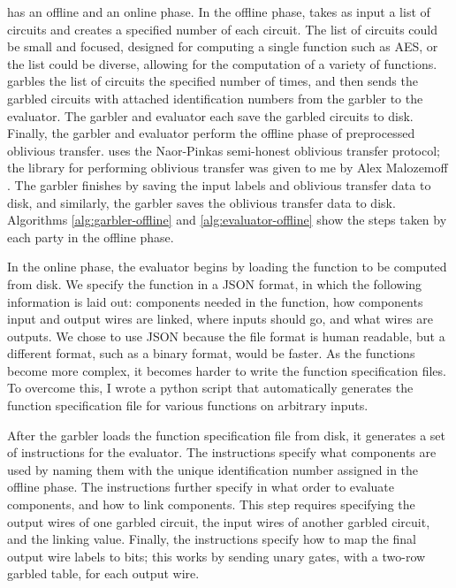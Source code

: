\CompGC has an offline and an online phase. 
In the offline phase, \CompGC takes as input a list of circuits and creates a specified number of each circuit. 
The list of circuits could be small and focused, designed for computing a single function such as AES, or the list could be diverse, allowing for the computation of a variety of functions. 
\CompGC garbles the list of circuits the specified number of times, and then sends the garbled circuits with attached identification numbers from the garbler to the evaluator. 
The garbler and evaluator each save the garbled circuits to disk. 
Finally, the garbler and evaluator perform the offline phase of preprocessed oblivious transfer. 
\CompGC uses the Naor-Pinkas semi-honest oblivious transfer protocol; the library for performing oblivious transfer was given to me by Alex Malozemoff \cite{naor-pinkas-ot}. 
The garbler finishes by saving the input labels and oblivious transfer data to disk, and similarly, the garbler saves the oblivious transfer data to disk. 
Algorithms \ref{alg:garbler-offline} and \ref{alg:evaluator-offline} show the steps taken by each party in the offline phase. 

In the online phase, the evaluator begins by loading the function to be computed from disk. 
We specify the function in a JSON format, in which the following information is laid out: components needed in the function, how components input and output wires are linked, where inputs should go, and what wires are outputs. 
We chose to use JSON because the file format is human readable, but a different format, such as a binary format, would be faster. 
As the functions become more complex, it becomes harder to write the function specification files. 
To overcome this, I wrote a python script that automatically generates the function specification file for various functions on arbitrary inputs. 

After the garbler loads the function specification file from disk, it generates a set of instructions for the evaluator. 
The instructions specify what components are used by naming them with the unique identification number assigned in the offline phase. 
The instructions further specify in what order to evaluate components, and how to link components. 
This step requires specifying the output wires of one garbled circuit, the input wires of another garbled circuit, and the linking value.
Finally, the instructions specify how to map the final output wire labels to bits; this works by sending unary gates, with a two-row garbled table, for each output wire. 

